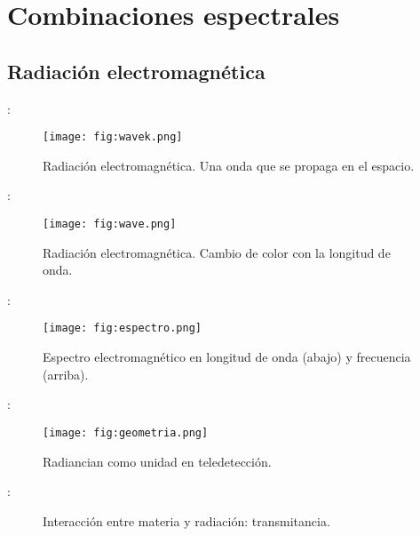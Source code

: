 \section{Combinaciones espectrales}


\subsection{Radiación electromagnética}
\begin{frame}{\secname : \subsecname}
  \begin{figure}
    \centering
    \texttt{[image: fig:wavek.png]}
    \caption{Radiación electromagnética. Una onda que se propaga en el espacio.}
    \label{}
  \end{figure}
\end{frame}

\begin{frame}{\secname : \subsecname}
  \begin{figure}
    \centering
    \texttt{[image: fig:wave.png]}
    \caption{Radiación electromagnética. Cambio de color con la longitud de onda.}
    \label{}
  \end{figure}
\end{frame}

\begin{frame}{\secname : \subsecname}
  \begin{figure}
    \centering
    \texttt{[image: fig:espectro.png]}
    \caption{Espectro electromagnético en longitud de onda (abajo) y frecuencia (arriba).}
    \label{}
  \end{figure}
\end{frame}

\begin{frame}{\secname : \subsecname}
  \begin{figure}
    \centering
    \texttt{[image: fig:geometria.png]}
    \caption{Radiancian como unidad en teledetección.}
    \label{}
  \end{figure}
\end{frame}

\begin{frame}{\secname : \subsecname}
  \begin{figure}
    \centering
    \caption{Interacción entre materia y radiación: transmitancia.}
    \label{}
  \end{figure}
\end{frame}


